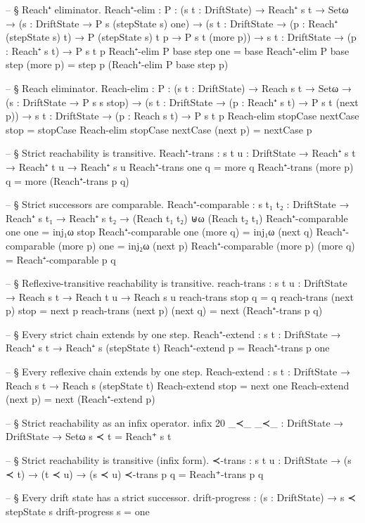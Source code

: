 \documentclass[11pt,a4paper]{book}
\begin{document}
\begin{code}
-- § Reach⁺ eliminator.
Reach⁺-elim :
  {P : (s t : DriftState) → Reach⁺ s t → Setω} →
  ({s : DriftState} → P s (stepState s) one) →
  ({s t : DriftState} → (p : Reach⁺ (stepState s) t) → P (stepState s) t p → P s t (more p)) →
  {s t : DriftState} → (p : Reach⁺ s t) → P s t p
Reach⁺-elim {P} base step one = base
Reach⁺-elim {P} base step (more p) = step p (Reach⁺-elim {P} base step p)

-- § Reach eliminator.
Reach-elim :
  {P : (s t : DriftState) → Reach s t → Setω} →
  ({s : DriftState} → P s s stop) →
  ({s t : DriftState} → (p : Reach⁺ s t) → P s t (next p)) →
  {s t : DriftState} → (p : Reach s t) → P s t p
Reach-elim stopCase nextCase stop = stopCase
Reach-elim stopCase nextCase (next p) = nextCase p

-- § Strict reachability is transitive.
Reach⁺-trans : {s t u : DriftState} → Reach⁺ s t → Reach⁺ t u → Reach⁺ s u
Reach⁺-trans one      q = more q
Reach⁺-trans (more p) q = more (Reach⁺-trans p q)

-- § Strict successors are comparable.
Reach⁺-comparable :
  {s t₁ t₂ : DriftState} →
  Reach⁺ s t₁ → Reach⁺ s t₂ →
  (Reach t₁ t₂) ⊎ω (Reach t₂ t₁)
Reach⁺-comparable one one = inj₁ω stop
Reach⁺-comparable one (more q) = inj₁ω (next q)
Reach⁺-comparable (more p) one = inj₂ω (next p)
Reach⁺-comparable (more p) (more q) =
  Reach⁺-comparable p q

-- § Reflexive-transitive reachability is transitive.
reach-trans : {s t u : DriftState} → Reach s t → Reach t u → Reach s u
reach-trans stop     q        = q
reach-trans (next p) stop     = next p
reach-trans (next p) (next q) = next (Reach⁺-trans p q)

-- § Every strict chain extends by one step.
Reach⁺-extend : {s t : DriftState} → Reach⁺ s t → Reach⁺ s (stepState t)
Reach⁺-extend p = Reach⁺-trans p one

-- § Every reflexive chain extends by one step.
Reach-extend : {s t : DriftState} → Reach s t → Reach s (stepState t)
Reach-extend stop     = next one
Reach-extend (next p) = next (Reach⁺-extend p)

-- § Strict reachability as an infix operator.
infix 20 _≺_
_≺_ : DriftState → DriftState → Setω
s ≺ t = Reach⁺ s t

-- § Strict reachability is transitive (infix form).
≺-trans : {s t u : DriftState} → (s ≺ t) → (t ≺ u) → (s ≺ u)
≺-trans p q = Reach⁺-trans p q

-- § Every drift state has a strict successor.
drift-progress : (s : DriftState) → s ≺ stepState s
drift-progress s = one


\end{code}
\end{document}
